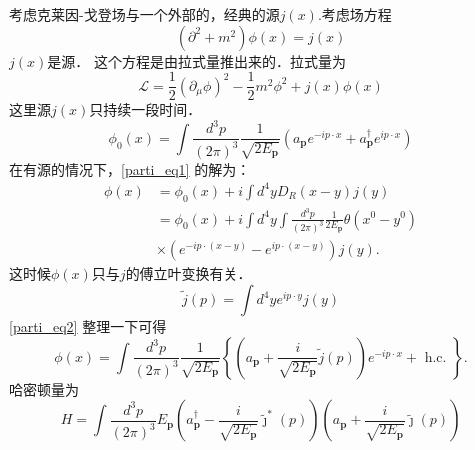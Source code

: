 
考虑克莱因-戈登场与一个外部的，经典的源$j(x)$.考虑场方程
\begin{equation}\label{parti_eq1}
(\partial^2+m^2)\phi(x) = j(x)
\end{equation}
$j(x)$是源． 这个方程是由拉式量推出来的．拉式量为
\begin{equation}
\mathcal L = \frac{1}{2} (\partial_\mu\phi)^2 - \frac{1}{2} m^2 \phi^2 + j(x) \phi(x)
\end{equation}
这里源$j(x)$只持续一段时间．
\begin{equation}
\phi_{0}(x)=\int \frac{d^{3} p}{(2 \pi)^{3}} \frac{1}{\sqrt{2 E_{\mathbf{p}}}}\left(a_{\mathbf{p}} e^{-i p \cdot x}+a_{\mathbf{p}}^{\dagger} e^{i p \cdot x}\right)
\end{equation}
在有源的情况下，\autoref{parti_eq1} 的解为：
\begin{equation}\label{parti_eq2}
\begin{aligned}
\phi(x) & =\phi_{0}(x)+i \int d^{4} y D_{R}(x-y) j(y) \\
& =\phi_{0}(x)+i \int d^{4} y \int \frac{d^{3} p}{(2 \pi)^{3}} \frac{1}{2 E_{\mathbf{p}}} \theta\left(x^{0}-y^{0}\right) \\
& \times\left(e^{-i p \cdot(x-y)}-e^{i p \cdot(x-y)}\right) j(y) .
\end{aligned}
\end{equation}
这时候$\phi(x)$只与$j$的傅立叶变换有关．
\begin{equation}
\tilde j (p) = \int d^4 y e^{ip \cdot y} j(y)
\end{equation}
\autoref{parti_eq2} 整理一下可得
\begin{equation}
\phi(x)=\int \frac{d^{3} p}{(2 \pi)^{3}} \frac{1}{\sqrt{2 E_{\mathbf{p}}}}\left\{\left(a_{\mathbf{p}}+\frac{i}{\sqrt{2 E_{\mathbf{p}}}} \tilde{j}(p)\right) e^{-i p \cdot x}+\text { h.c. }\right\} .
\end{equation}
哈密顿量为
\begin{equation}
H=\int \frac{d^{3} p}{(2 \pi)^{3}} E_{\mathbf{p}}\left(a_{\mathbf{p}}^{\dagger}-\frac{i}{\sqrt{2 E_{\mathbf{p}}}} \tilde{\jmath}^{*}(p)\right)\left(a_{\mathbf{p}}+\frac{i}{\sqrt{2 E_{\mathbf{p}}}} \tilde{\jmath}(p)\right)
\end{equation}


